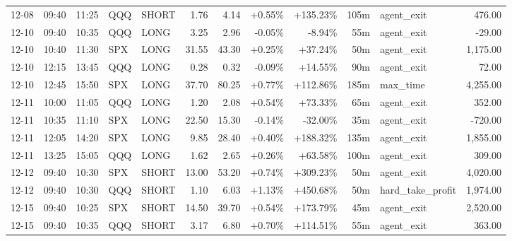 \documentclass[11pt,a4paper,twoside]{article}
\begin{document}
\begin{center}
\begin{longtable}{>{\color{txtmain}}l l l l l r r r r r >{\color{txtmain}}l r}
12-08 & 09:40 & 11:25 & QQQ & SHORT & 1.76 & 4.14 & \textcolor{wingreen}{+0.55\%} & \textcolor{wingreen}{+135.23\%} & 105m & agent\_exit & \textcolor{wingreen}{476.00} \\
12-10 & 09:40 & 10:35 & QQQ & LONG & 3.25 & 2.96 & \textcolor{lossred}{-0.05\%} & \textcolor{lossred}{-8.94\%} & 55m & agent\_exit & \textcolor{lossred}{-29.00} \\
12-10 & 10:40 & 11:30 & SPX & LONG & 31.55 & 43.30 & \textcolor{wingreen}{+0.25\%} & \textcolor{wingreen}{+37.24\%} & 50m & agent\_exit & \textcolor{wingreen}{1,175.00} \\
12-10 & 12:15 & 13:45 & QQQ & LONG & 0.28 & 0.32 & \textcolor{lossred}{-0.09\%} & \textcolor{wingreen}{+14.55\%} & 90m & agent\_exit & \textcolor{wingreen}{72.00} \\
12-10 & 12:45 & 15:50 & SPX & LONG & 37.70 & 80.25 & \textcolor{wingreen}{+0.77\%} & \textcolor{wingreen}{+112.86\%} & 185m & max\_time & \textcolor{wingreen}{4,255.00} \\
12-11 & 10:00 & 11:05 & QQQ & LONG & 1.20 & 2.08 & \textcolor{wingreen}{+0.54\%} & \textcolor{wingreen}{+73.33\%} & 65m & agent\_exit & \textcolor{wingreen}{352.00} \\
12-11 & 10:35 & 11:10 & SPX & LONG & 22.50 & 15.30 & \textcolor{lossred}{-0.14\%} & \textcolor{lossred}{-32.00\%} & 35m & agent\_exit & \textcolor{lossred}{-720.00} \\
12-11 & 12:05 & 14:20 & SPX & LONG & 9.85 & 28.40 & \textcolor{wingreen}{+0.40\%} & \textcolor{wingreen}{+188.32\%} & 135m & agent\_exit & \textcolor{wingreen}{1,855.00} \\
12-11 & 13:25 & 15:05 & QQQ & LONG & 1.62 & 2.65 & \textcolor{wingreen}{+0.26\%} & \textcolor{wingreen}{+63.58\%} & 100m & agent\_exit & \textcolor{wingreen}{309.00} \\
12-12 & 09:40 & 10:30 & SPX & SHORT & 13.00 & 53.20 & \textcolor{wingreen}{+0.74\%} & \textcolor{wingreen}{+309.23\%} & 50m & agent\_exit & \textcolor{wingreen}{4,020.00} \\
12-12 & 09:40 & 10:30 & QQQ & SHORT & 1.10 & 6.03 & \textcolor{wingreen}{+1.13\%} & \textcolor{wingreen}{+450.68\%} & 50m & hard\_take\_profit & \textcolor{wingreen}{1,974.00} \\
12-15 & 09:40 & 10:25 & SPX & SHORT & 14.50 & 39.70 & \textcolor{wingreen}{+0.54\%} & \textcolor{wingreen}{+173.79\%} & 45m & agent\_exit & \textcolor{wingreen}{2,520.00} \\
12-15 & 09:40 & 10:35 & QQQ & SHORT & 3.17 & 6.80 & \textcolor{wingreen}{+0.70\%} & \textcolor{wingreen}{+114.51\%} & 55m & agent\_exit & \textcolor{wingreen}{363.00} \\

\end{longtable}
\end{center}
\end{document}
